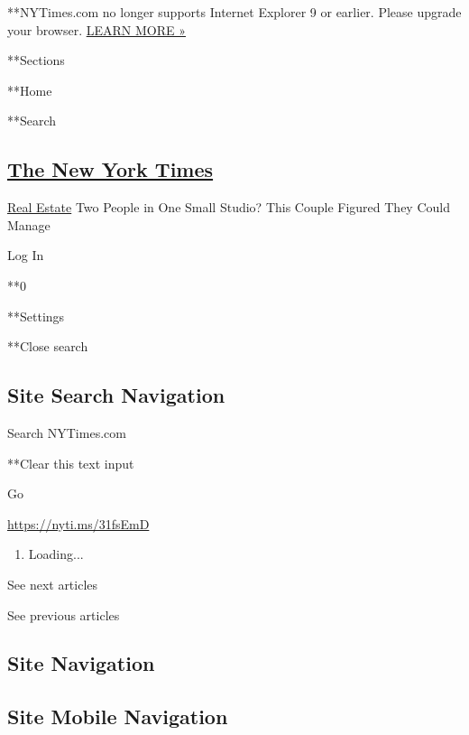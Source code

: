  **NYTimes.com no longer supports Internet Explorer 9 or earlier. Please
upgrade your browser.
\href{http://www.nytimes.com/content/help/site/ie9-support.html}{LEARN
MORE »}

**Sections

**Home

**Search

\hypertarget{the-new-york-times}{%
\subsection{\texorpdfstring{\href{http://www.nytimes.com/}{The New York
Times}}{The New York Times}}\label{the-new-york-times}}

 \href{https://www.nytimes.com/section/realestate}{Real Estate}
\textbar{}Two People in One Small Studio? This Couple Figured They Could
Manage

Log In

**0

**Settings

**Close search

\hypertarget{site-search-navigation}{%
\subsection{Site Search Navigation}\label{site-search-navigation}}

Search NYTimes.com

**Clear this text input

Go

\url{https://nyti.ms/31fsEmD}

\begin{enumerate}
\def\labelenumi{\arabic{enumi}.}
\item
  Loading...
\end{enumerate}

See next articles

See previous articles

\hypertarget{site-navigation}{%
\subsection{Site Navigation}\label{site-navigation}}

\hypertarget{site-mobile-navigation}{%
\subsection{Site Mobile Navigation}\label{site-mobile-navigation}}

